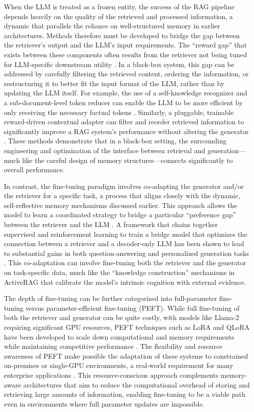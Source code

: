 \documentclass[11pt]{article}
\begin{document}
When the LLM is treated as a frozen entity, the success of the RAG pipeline depends heavily on the quality of the retrieved and processed information, a dynamic that parallels the reliance on well-structured memory in earlier architectures. Methods therefore must be developed to bridge the gap between the retriever's output and the LLM's input requirements. The ``reward gap'' that exists between these components often results from the retriever not being tuned for LLM-specific downstream utility \cite{ref66}. In a black-box system, this gap can be addressed by carefully filtering the retrieved content, ordering the information, or restructuring it to better fit the input format of the LLM, rather than by updating the LLM itself. For example, the use of a self-knowledge recognizer and a sub-document-level token reducer can enable the LLM to be more efficient by only receiving the necessary factual tokens \cite{ref66}. Similarly, a pluggable, trainable reward-driven contextual adapter can filter and reorder retrieved information to significantly improve a RAG system's performance without altering the generator \cite{ref57}. These methods demonstrate that in a black-box setting, the surrounding engineering and optimization of the interface between retrieval and generation---much like the careful design of memory structures---connects significantly to overall performance.

In contrast, the fine-tuning paradigm involves co-adapting the generator and/or the retriever for a specific task, a process that aligns closely with the dynamic, self-reflective memory mechanisms discussed earlier. This approach allows the model to learn a coordinated strategy to bridge a particular ``preference gap'' between the retriever and the LLM \cite{ref55}. A framework that chains together supervised and reinforcement learning to train a bridge model that optimizes the connection between a retriever and a decoder-only LLM has been shown to lead to substantial gains in both question-answering and personalized generation tasks \cite{ref55}. This co-adaptation can involve fine-tuning both the retriever and the generator on task-specific data, much like the ``knowledge construction'' mechanisms in ActiveRAG that calibrate the model's intrinsic cognition with external evidence.

The depth of fine-tuning can be further categorized into full-parameter fine-tuning versus parameter-efficient fine-tuning (PEFT). While full fine-tuning of both the retriever and generator can be quite costly, with models like Llama-2 requiring significant GPU resources, PEFT techniques such as LoRA and QLoRA have been developed to scale down computational and memory requirements while maintaining competitive performance \cite{ref68,ref69}. The flexibility and resource awareness of PEFT make possible the adaptation of these systems to constrained on-premises or single-GPU environments, a real-world requirement for many enterprise applications \cite{ref70}. This resource-conscious approach complements memory-aware architectures that aim to reduce the computational overhead of storing and retrieving large amounts of information, enabling fine-tuning to be a viable path even in environments where full parameter updates are impossible.
\end{document}
